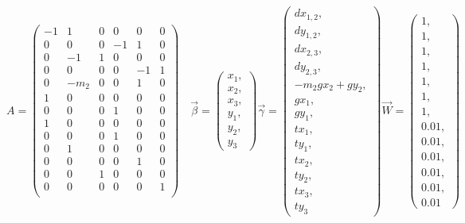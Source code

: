 \documentclass[]{spie}  %
\begin{document}
\[
A =
\begin{pmatrix}
  -1 & 1 & 0 & 0 & 0 & 0\\
  0 & 0 & 0 & -1 & 1 & 0\\
  0 & -1 & 1 & 0 & 0 & 0\\
  0 & 0 & 0 & 0 & -1 & 1\\
  0 & -m_2 & 0 & 0 & 1 & 0\\
  1 & 0 & 0 & 0 & 0 & 0\\
  0 & 0 & 0 & 1 & 0 & 0\\
  1 & 0 & 0 & 0 & 0 & 0\\
  0 & 0 & 0 & 1 & 0 & 0\\
  0 & 1 & 0 & 0 & 0 & 0\\
  0 & 0 & 0 & 0 & 1 & 0\\
  0 & 0 & 1 & 0 & 0 & 0\\
  0 & 0 & 0 & 0 & 0 & 1\\


\end{pmatrix}\quad
\vec{\beta} =
\begin{pmatrix}
  x_1, \\ x_2, \\ x_3, \\ y_1, \\ y_2, \\ y_3
\end{pmatrix}
\vec{\gamma} =
\begin{pmatrix}
  dx_{1,2}, \\ dy_{1,2}, \\ dx_{2,3}, \\ dy_{2,3}, \\ -m_2gx_2 + gy_2,
  \\ gx_1, \\ gy_1, \\ tx_1, \\ ty_1, \\ tx_2, \\ ty_2, \\ tx_3, \\
  ty_3
  
\end{pmatrix}
\vec{W} =
\begin{pmatrix}
  1, \\ 1, \\ 1, \\ 1, \\ 1, \\ 1, \\ 1, \\ 0.01, \\ 0.01, \\ 0.01, \\
  0.01, \\ 0.01, \\ 0.01
\end{pmatrix}
\]
\end{document}
